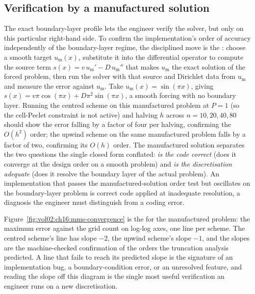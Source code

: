 \subsection{Verification by a manufactured solution}

The exact boundary-layer profile lets the engineer verify the solver, but
only on this particular right-hand side. To confirm the implementation's
order of accuracy independently of the boundary-layer regime, the disciplined
move is the : choose a smooth
target $u_{\mathrm{m}}(x)$, substitute it into the differential operator to
compute the source term $s(x) = v\,u_{\mathrm{m}}' - D\,u_{\mathrm{m}}''$
that makes $u_{\mathrm{m}}$ the exact solution of the forced problem, then
run the solver with that source and Dirichlet data from $u_{\mathrm{m}}$ and
measure the error against $u_{\mathrm{m}}$. Take $u_{\mathrm{m}}(x) =
\sin(\pi x)$, giving $s(x) = v\pi\cos(\pi x) + D\pi^{2}\sin(\pi x)$, a smooth
forcing with no boundary layer. Running the centred scheme on this
manufactured problem at $P = 1$ (so the cell-Peclet constraint is not
active) and halving $h$ across $n = 10, 20, 40, 80$ should show the error
falling by a factor of four per halving, confirming the $O(h^{2})$ order; the
upwind scheme on the same manufactured problem falls by a factor of two,
confirming its $O(h)$ order. The manufactured solution separates the two
questions the single closed form conflated: \emph{is the code correct}
(does it converge at the design order on a smooth problem) and \emph{is the
discretisation adequate} (does it resolve the boundary layer of the actual
problem). An implementation that passes the manufactured-solution order test
but oscillates on the boundary-layer problem is correct code applied at
inadequate resolution, a diagnosis the engineer must distinguish from a
coding error.



Figure~\ref{fig:vol02:ch16:mms-convergence} is the  for the manufactured problem: the maximum error against the grid
count on log-log axes, one line per scheme. The centred scheme's line has
slope $-2$, the upwind scheme's slope $-1$, and the slopes are the
machine-checked confirmation of the orders the truncation analysis predicted.
A line that fails to reach its predicted slope is the signature of an
implementation bug, a boundary-condition error, or an unresolved feature, and
reading the slope off this diagram is the single most useful verification an
engineer runs on a new discretisation.

